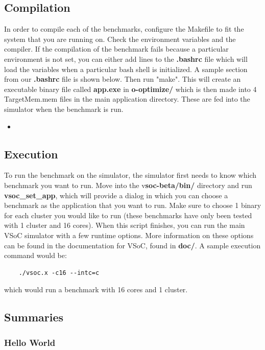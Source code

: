 \documentclass{article}
\newcommand{\bashscript}[2]{
\begin{itemize}
\item[]
\end{itemize}
}
\begin{document}
\subsection{Compilation}

In order to compile each of the benchmarks, configure the Makefile to fit the system that you 
are running on. Check the environment variables and the compiler. If the compilation of the 
benchmark fails because a particular environment is not set, you can either add lines to the 
\textbf{.bashrc} file which will load the variables when a particular bash shell is initialized.  A sample section 
from our \textbf{.bashrc} file is shown below. Then run 
"make". This will create an executable binary file called \textbf{app.exe} in \textbf{o-optimize/} which is then 
made into 4 TargetMem\*.mem files in the main application directory. These are 
fed into the simulator when the benchmark is run. 

\bashscript{bash}{Sample .bashrc file for environment variables}

\subsection{Execution}

To run the benchmark on the simulator, the simulator first needs to know which 
benchmark you want to run. Move into the v\textbf{soc-beta/bin/} directory and run 
\textbf{vsoc\_set\_app}, which will provide a dialog in which you can choose a 
benchmark as the application that you want to run.  Make sure to choose 1 
binary for each cluster you would like to run (these benchmarks have only been 
tested with 1 cluster and 16 cores). When this script finishes, you can run the 
main VSoC simulator with a few runtime options. More information on these 
options can be found in the documentation for VSoC, found in \textbf{doc/}.  
A sample execution command would be:
\begin{center}
\begin{verbatim} 
	./vsoc.x -c16 --intc=c 
\end{verbatim} 
\end{center}
which would run a benchmark with 16 cores and 1 cluster. 

\subsection{Summaries}
\subsubsection{Hello World}
\end{document}
